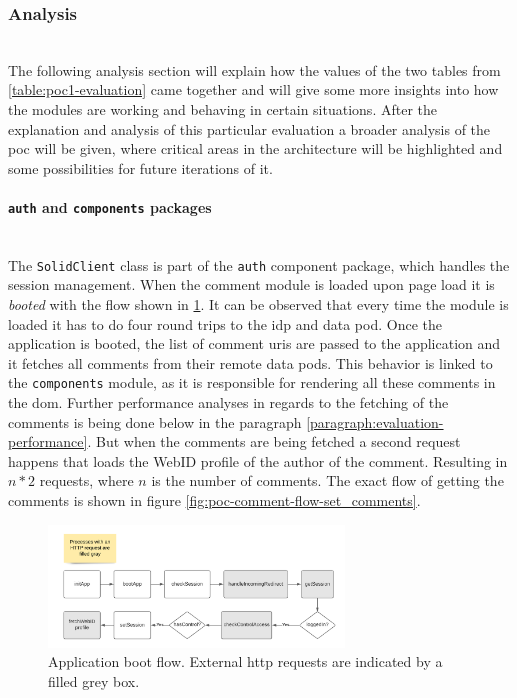 \subsubsection{Analysis}\mbox{}\\

The following analysis section will explain how the values of the two tables from \ref{table:poc1-evaluation} came together and will give some more insights into how the modules are working and behaving in certain situations. After the explanation and analysis of this particular evaluation a broader analysis of the \gls{poc} will be given, where critical areas in the architecture will be highlighted and some possibilities for future iterations of it.
\vspace{0.5cm}
\paragraph{\texttt{auth} and \texttt{components} packages}\mbox{}\\

The \texttt{SolidClient} class is part of the \texttt{auth} component package, which handles the session management. When the comment module is loaded upon page load it is \textit{booted} with the flow shown in \ref{fig:poc-comment-flow-app_boot}. It can be observed that every time the module is loaded it has to do four round trips to the \gls{idp} and data pod. Once the application is booted, the list of comment \glspl{uri} are passed to the application and it fetches all comments from their remote data pods. This behavior is linked to the \texttt{components} module, as it is responsible for rendering all these comments in the \gls{dom}. Further performance analyses in regards to the fetching of the comments is being done below in the paragraph \ref{paragraph:evaluation-performance}. But when the comments are being fetched a second request happens that loads the WebID profile of the author of the comment. Resulting in $n*2$ requests, where $n$ is the number of comments. The exact flow of getting the comments is shown in figure \ref{fig:poc-comment-flow-set_comments}.

\begin{figure}[H]
    \centering
    \includegraphics[width=0.7\textwidth]{prototype/graphs/poc-comment-flow-app_boot.png}
    \caption{Application boot flow. External \gls{http} requests are indicated by a filled grey box.}
    \label{fig:poc-comment-flow-app_boot}
\end{figure}

